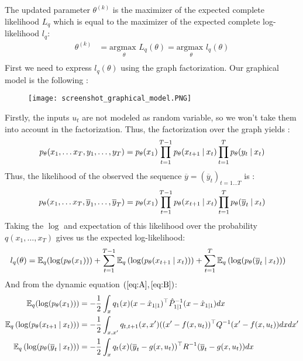 The updated parameter $\theta^{(k)}$ is the maximizer of the expected complete likelihood $L_q$ which is equal to the maximizer of the expected complete log-likelihood $l_q$:
\begin{align*}
  \theta^{(k)} &= \underset{\theta}{\text{argmax }}L_q(\theta) = \underset{\theta}{\text{argmax }}l_q(\theta)\\
\end{align*}
First we need to express $l_q(\theta)$ using the graph factorization.
Our graphical model is the following :
\begin{figure}[H]
	\texttt{[image: screenshot\_graphical\_model.PNG]}
\end{figure}
Firstly, the inputs $u_t$ are not modeled as random variable, so we won't take them into account in the factorization.
Thus, the factorization over the graph yields :
\begin{align*}
p_{\theta}(x_1, \ldots x_T, y_1, \ldots , y_T) &= p_{\theta}(x_1) \prod_{t=1}^{T-1}{p_{\theta}(x_{t+1} \mathbin{\vert} x_t)} \prod_{t=1}^{T}{p_{\theta}(y_t \mathbin{\vert} x_t)}\\
\end{align*}
Thus, the likelihood of the observed the sequence $\overline{y} = (\overline{y}_t)_{t=1 \ldots T}$ is :
\begin{align*}
  p_{\theta}(x_1, \ldots x_T, \overline{y}_1, \ldots , \overline{y}_T) &= p_{\theta}(x_1) \prod_{t=1}^{T-1}{p_{\theta}(x_{t+1}\mathbin{\vert} x_t)} \prod_{t=1}^{T}{p_{\theta}(\overline{y}_t \mathbin{\vert} x_t)}\\
\end{align*}
Taking the $\log$ and expectation of this likelihood over the probability $q \left(x_1, \ldots ,x_T \right)$ gives us the expected log-likelihood:
\begin{eqnarray*}
  l_q(\theta) & =
    \mathbb{E}_q(\log(p_{\theta}(x_1))) +
    \sum_{t=1}^{T-1}{\mathbb{E}_q \left( \log(p_{\theta}(x_{t+1} \mathbin{\vert} x_t)) \right)} +
    \sum_{t=1}^{T}{\mathbb{E}_q\left( \log(p_{\theta}(\overline{y}_t \mathbin{\vert} x_t)) \right)}
\end{eqnarray*}
And from the dynamic equation $(\ref{eq:A},\ref{eq:B})$:
\begin{align*}
  \mathbb{E}_q(\log(p_{\theta}(x_1))) &= -\frac{1}{2}\int_x{q_1(x) (x - \hat{x}_{1 \mathbin{\vert} 1})^{\top} \hat{P}_{1 \mathbin{\vert} 1}^{-1} (x - \hat{x}_{1 \mathbin{\vert} 1}) dx}
  \\
  \mathbb{E}_q \left( \log(p_{\theta}(x_{t+1} \mathbin{\vert} x_t)) \right) &= -\frac{1}{2}\int_{x,x'}{q_{t,t+1}(x, x') ((x' - f(x,u_t))^{\top} Q^{-1} (x' - f(x,u_t)) dxdx'}\\
  \mathbb{E}_q\left( \log(p_{\theta}(\overline{y}_t \mathbin{\vert} x_t)) \right) &= -\frac{1}{2}\int_x{q_t(x) (\overline{y}_t - g(x, u_t))^{\top} R^{-1} (\overline{y}_t - g(x, u_t)) dx}\\
\end{align*}
